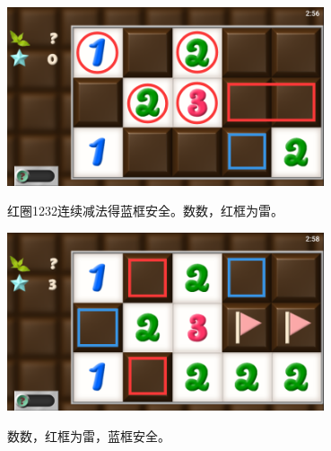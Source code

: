 \subsection{} %
\begin{center}
    \includegraphics[width=0.7\textwidth]{puzzle/36-1.png}
\end{center}
红圈1232连续减法得蓝框安全。数数，红框为雷。
\begin{center}
    \includegraphics[width=0.7\textwidth]{puzzle/36-2.png}
\end{center}
数数，红框为雷，蓝框安全。

